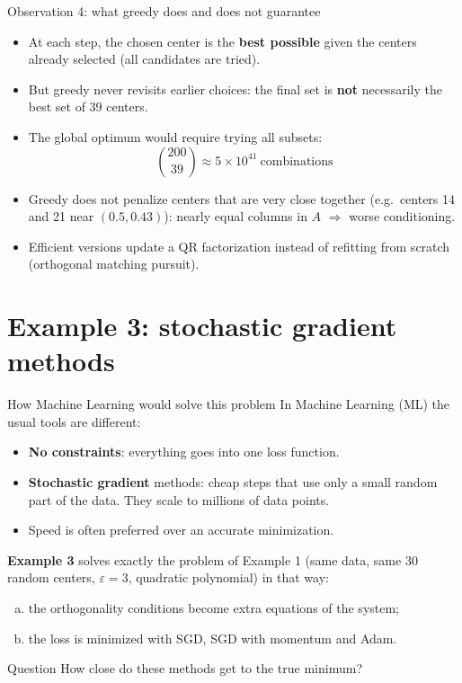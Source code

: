 \documentclass[10pt,aspectratio=169]{beamer}
\newcommand{\hl}[1]{\textcolor{accent}{\textbf{#1}}}
\begin{document}
\begin{frame}{Observation 4: what greedy does and does not guarantee}
  \begin{itemize}
    \item At each step, the chosen center is the \hl{best possible} given
          the centers already selected (all candidates are tried).
    \item But greedy never revisits earlier choices: the final set is
          \hl{not} necessarily the best set of 39 centers.
    \item The global optimum would require trying all subsets:
          \[
            \binom{200}{39} \approx 5\times 10^{41}\ \text{combinations}
          \]
    \item Greedy does not penalize centers that are very close together
          (e.g.\ centers 14 and 21 near $(0.5, 0.43)$): nearly equal columns
          in $A$ $\Rightarrow$ worse conditioning.
    \item Efficient versions update a QR factorization instead of refitting
          from scratch (orthogonal matching pursuit).
  \end{itemize}
\end{frame}

\section{Example 3: stochastic gradient methods}

\begin{frame}{How Machine Learning would solve this problem}
  In Machine Learning (ML) the usual tools are different:
  \begin{itemize}
    \item \hl{No constraints}: everything goes into one loss function.
    \item \hl{Stochastic gradient} methods: cheap steps that use only a small
          random part of the data. They scale to millions of data points.
    \item Speed is often preferred over an accurate minimization.
  \end{itemize}
  \vspace{0.5em}
  \textbf{Example 3} solves exactly the problem of Example 1 (same data,
  same 30 random centers, $\varepsilon=3$, quadratic polynomial) in that way:
  \begin{enumerate}[(a)]
    \item the orthogonality conditions become extra equations of the system;
    \item the loss is minimized with SGD, SGD with momentum and Adam.
  \end{enumerate}
  \vspace{0.5em}
  \begin{alertblock}{Question}
    How close do these methods get to the true minimum?
  \end{alertblock}
\end{frame}
\end{document}
